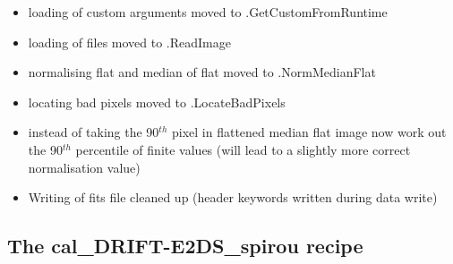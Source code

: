 \begin{itemize}
	\item loading of custom arguments moved to \spirouStartup.GetCustomFromRuntime

	\item loading of files moved to \spirouImage.ReadImage

	\item normalising flat and median of flat moved to \spirouImage.NormMedianFlat

	\item locating bad pixels moved to \spirouImage.LocateBadPixels

	\item instead of taking the 90$^{th}$ pixel in flattened median flat image now work out the 90$^{th}$ percentile of finite values (will lead to a slightly more correct normalisation value)

	\item Writing of fits file cleaned up (header keywords written during data write)
\end{itemize}


\subsection{The cal\_DRIFT-E2DS\_spirou recipe}
\label{ch:changelog:At4:cal_DRIFT-E2DS_spirou}

